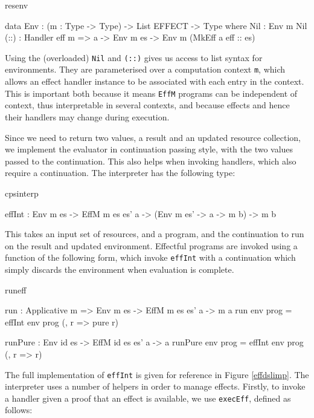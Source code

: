 \begin{SaveVerbatim}{resenv}

data Env  : (m : Type -> Type) -> 
            List EFFECT -> Type where
     Nil  : Env m Nil
     (::) : Handler eff m => 
            a -> Env m es -> Env m (MkEff a eff :: es)

\end{SaveVerbatim}
\label{sect:envdef}

\noindent
Using the (overloaded) \texttt{Nil} and \texttt{(::)} gives us access to list
syntax for environments. They are parameterised over a computation context
\texttt{m}, which allows an effect handler instance to be associated with each
entry in the context. This is important both because it means \texttt{EffM}
programs can be independent of context, thus interpretable in several
contexts, and because effects and hence their handlers may change during 
execution.

Since we need to return two values, a result and an updated resource collection,
we implement the evaluator in continuation passing style, with the two values
passed to the continuation. This also helps when invoking handlers, which also
require a continuation. The interpreter has the following type:

\begin{SaveVerbatim}{cpsinterp}

effInt : Env m es -> EffM m es es' a -> 
         (Env m es' -> a -> m b) -> m b

\end{SaveVerbatim}

\noindent
This takes an input set of resources, and a program, and the continuation to run
on the result and updated environment. Effectful programs are invoked using
a function of the following form, which invoke \texttt{effInt}
with a continuation which simply discards the environment when evaluation is
complete.

\begin{SaveVerbatim}{runeff}

run : Applicative m => 
      Env m es -> EffM m es es' a -> m a
run env prog = effInt env prog (\env, r => pure r)

runPure : Env id es -> EffM id es es' a -> a
runPure env prog = effInt env prog (\env, r => r)

\end{SaveVerbatim}

\noindent
The full implementation of \texttt{effInt} is given for reference in
Figure \ref{effdslimp}. The interpreter uses a number of helpers in order
to manage effects. Firstly, to invoke a handler given a proof that an effect
is available, we use \texttt{execEff}, defined as follows:

